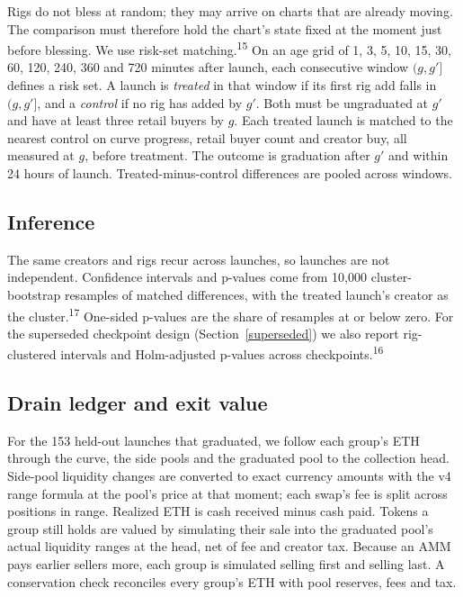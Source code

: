 \documentclass{ledger}
\newcommand{\n}[1]{\textsuperscript{#1}}
\begin{document}
Rigs do not bless at random; they may arrive on charts that are already moving. The comparison must therefore hold the chart's state fixed at the moment just before blessing. We use risk-set matching.\n{15} On an age grid of 1, 3, 5, 10, 15, 30, 60, 120, 240, 360 and 720 minutes after launch, each consecutive window $(g, g']$ defines a risk set. A launch is \emph{treated} in that window if its first rig add falls in $(g, g']$, and a \emph{control} if no rig has added by $g'$. Both must be ungraduated at $g'$ and have at least three retail buyers by $g$. Each treated launch is matched to the nearest control on curve progress, retail buyer count and creator buy, all measured at $g$, before treatment. The outcome is graduation after $g'$ and within 24 hours of launch. Treated-minus-control differences are pooled across windows.

\subsection{Inference}

The same creators and rigs recur across launches, so launches are not independent. Confidence intervals and p-values come from 10,000 cluster-bootstrap resamples of matched differences, with the treated launch's creator as the cluster.\n{17} One-sided p-values are the share of resamples at or below zero. For the superseded checkpoint design (Section~\ref{superseded}) we also report rig-clustered intervals and Holm-adjusted p-values across checkpoints.\n{16}

\subsection{Drain ledger and exit value}

For the 153 held-out launches that graduated, we follow each group's ETH through the curve, the side pools and the graduated pool to the collection head. Side-pool liquidity changes are converted to exact currency amounts with the v4 range formula at the pool's price at that moment; each swap's fee is split across positions in range. Realized ETH is cash received minus cash paid. Tokens a group still holds are valued by simulating their sale into the graduated pool's actual liquidity ranges at the head, net of fee and creator tax. Because an AMM pays earlier sellers more, each group is simulated selling first and selling last. A conservation check reconciles every group's ETH with pool reserves, fees and tax.
\end{document}
